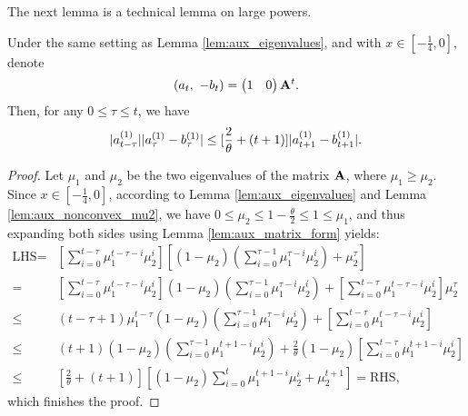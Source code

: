 The next lemma is a technical lemma on large powers.
\begin{lemma} \label{lem:aux_eigen_combo_inequal} 
Under the same setting as Lemma \ref{lem:aux_eigenvalues}, 
and with $x \in [-\frac{1}{4}, 0]$, denote
\begin{equation*}
(a_t, ~-b_t) = \begin{pmatrix} 1 & 0  \end{pmatrix} \mathbf{A}^t.
\end{equation*}
Then, for any $0\le\tau\le t$, we have 
\begin{equation*}
|a^{(1)}_{t-\tau}||a^{(1)}_{\tau} - b^{(1)}_{\tau}| \\
\le  [\frac{2}{\theta} + (t+1)] |a^{(1)}_{t+1} - b^{(1)}_{t+1}|.
\end{equation*}
\end{lemma}
\begin{proof}
Let $\mu_1$ and $\mu_2$ be the two eigenvalues of the matrix $\mathbf{A}$,
where $\mu_1 \ge \mu_2$.  Since $x\in [-\frac{1}{4}, 0]$, 
according to Lemma \ref{lem:aux_eigenvalues} and 
Lemma \ref{lem:aux_nonconvex_mu2}, we have 
$0\le \mu_2\le 1 - \frac{\theta}{2} \le 1 \le \mu_1$, 
and thus expanding both sides using Lemma \ref{lem:aux_matrix_form} yields:
\begin{align*}
\text{LHS} =& 
\left[\sum_{i=0}^{t-\tau}\mu_1^{t-\tau-i}\mu_2^i\right]
\left[(1-\mu_2)\left(\sum_{i=0}^{\tau-1}\mu_1^{\tau-i}\mu_2^i\right) + \mu_2^\tau \right] \\
=& \left[\sum_{i=0}^{t-\tau}\mu_1^{t-\tau-i}\mu_2^i\right](1-\mu_2)\left(\sum_{i=0}^{\tau-1}\mu_1^{\tau-i}\mu_2^i\right)
+ \left[\sum_{i=0}^{t-\tau}\mu_1^{t-\tau-i}\mu_2^i\right] \mu_2^\tau \\
\le& (t-\tau+1)\mu_1^{t-\tau} (1-\mu_2)\left(\sum_{i=0}^{\tau-1}\mu_1^{\tau-i}\mu_2^i\right)
 + \left[\sum_{i=0}^{t-\tau}\mu_1^{t-\tau-i}\mu_2^i\right] \\
\le& (t+1)(1-\mu_2)\left(\sum_{i=0}^{\tau-1}\mu_1^{t+1-i}\mu_2^i\right)
+\frac{2}{\theta}(1-\mu_2)\left[\sum_{i=0}^{t-\tau}\mu_1^{t+1-i}\mu_2^i\right] \\
\le& [\frac{2}{\theta}+ (t+1)]\left[(1-\mu_2)\sum_{i=0}^{t}\mu_1^{t+1-i}\mu_2^i
+ \mu_2^{t+1}\right]
 =  \text{RHS},
\end{align*}
which finishes the proof.
\end{proof}


